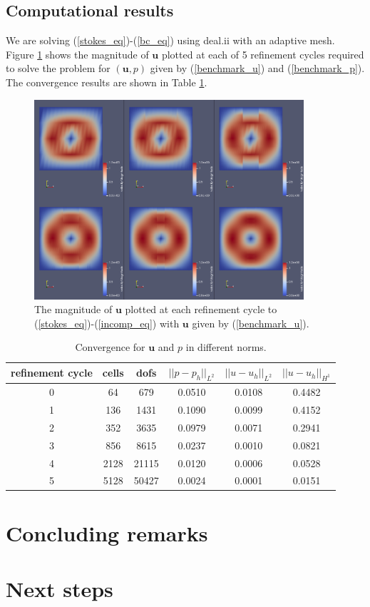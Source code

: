 \documentclass[12pt,a4paper]{article}
\theoremstyle{definition}
\begin{document}
\subsection{Computational results}
We are solving (\ref{stokes_eq})-(\ref{bc_eq}) using deal.ii with an adaptive mesh.  Figure \ref{fig_stokes_sol}  shows the magnitude of $\textbf{u}$ plotted at each of 5 refinement cycles required to solve the problem for $\left(\textbf{u}, p\right)$ given by (\ref{benchmark_u}) and (\ref{benchmark_p}).  The convergence results are shown in Table \ref{tablebenchmark_convergence}.
\begin{figure}[H]
	\centering
	\includegraphics[width=10cm]{stokes_cg_velocities}
	\caption{The magnitude of $\textbf{u}$ plotted at each refinement cycle to (\ref{stokes_eq})-(\ref{incomp_eq}) with $\textbf{u}$ given by (\ref{benchmark_u}).}
	\label{fig_stokes_sol}
\end{figure}
\begin{table}[H]
	\begin{center}
		\begin{tabular}{|c|c|c|c|c|c|} \hline
	refinement cycle & cells & dofs & $||p-p_h||_{L^2}$ & $||u-u_h||_{L^2}$ & $||u-u_h||_{H^1}$\\ \hline
	0 & 64 & 679 & 0.0510 & 0.0108 & 0.4482\\ \hline
	1 & 136 & 1431 & 0.1090 & 0.0099 & 0.4152\\ \hline
	2 & 352 & 3635 & 0.0979 & 0.0071 & 0.2941\\ \hline
	3 & 856 & 8615 & 0.0237 & 0.0010 & 0.0821\\ \hline
	4 & 2128 & 21115 & 0.0120 & 0.0006 & 0.0528\\ \hline
	5 & 5128 & 50427 & 0.0024 & 0.0001 & 0.0151\\ \hline
		\end{tabular}
	\caption{Convergence for $\textbf{u}$ and $p$ in different norms.}
	\label{tablebenchmark_convergence}
	\end{center}
\end{table}
\section{Concluding remarks}
\section{Next steps}


\end{document}
